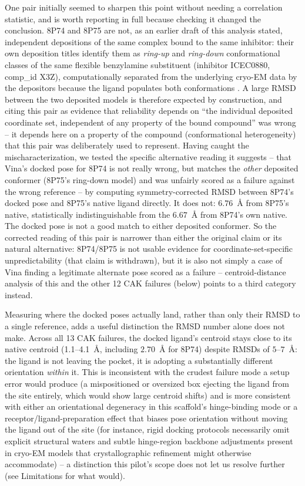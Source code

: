 \documentclass[11pt]{article}
\begin{document}
One pair initially seemed to sharpen this point without needing a
correlation statistic, and is worth reporting in full because checking it
changed the conclusion. 8P74 and 8P75 are not, as an earlier draft of this
analysis stated, independent depositions of the same complex bound to the
same inhibitor: their own deposition titles identify them as
\emph{ring-up} and \emph{ring-down} conformational classes of the same
flexible benzylamine substituent (inhibitor ICEC0880, comp\_id X3Z),
computationally separated from the underlying cryo-EM data by the
depositors because the ligand populates both conformations
\citep{cushing2024}. A large RMSD between the two deposited models is
therefore expected by construction, and citing this pair as evidence that
reliability depends on ``the individual deposited coordinate set,
independent of any property of the bound compound'' was wrong -- it
depends here on a property of the compound (conformational heterogeneity)
that this pair was deliberately used to represent. Having caught the
mischaracterization, we tested the specific alternative reading it
suggests -- that Vina's docked pose for 8P74 is not really wrong, but
matches the \emph{other} deposited conformer (8P75's ring-down model) and
was unfairly scored as a failure against the wrong reference -- by
computing symmetry-corrected RMSD between 8P74's docked pose and 8P75's
native ligand directly. It does not: $6.76$~{\AA} from 8P75's native,
statistically indistinguishable from the $6.67$~{\AA} from 8P74's own
native. The docked pose is not a good match to either deposited
conformer. So the corrected reading of this pair is narrower than either
the original claim or its natural alternative: 8P74/8P75 is not usable
evidence for coordinate-set-specific unpredictability (that claim is
withdrawn), but it is also not simply a case of Vina finding a legitimate
alternate pose scored as a failure -- centroid-distance analysis of this
and the other 12 CAK failures (below) points to a third category instead.

Measuring where the docked poses actually land, rather than only their
RMSD to a single reference, adds a useful distinction the RMSD number
alone does not make. Across all 13 CAK failures, the docked ligand's
centroid stays close to its native centroid (1.1--4.1~{\AA}, including
$2.70$~{\AA} for 8P74) despite RMSDs of $5$--$7$~{\AA}: the ligand is not
leaving the pocket, it is adopting a substantially different orientation
\emph{within} it. This is inconsistent with the crudest failure mode a
setup error would produce (a mispositioned or oversized box ejecting the
ligand from the site entirely, which would show large centroid shifts) and
is more consistent with either an orientational degeneracy in this
scaffold's hinge-binding mode or a receptor/ligand-preparation effect that
biases pose orientation without moving the ligand out of the site (for instance,
rigid docking protocols necessarily omit explicit structural waters and subtle
hinge-region backbone adjustments present in cryo-EM models that crystallographic
refinement might otherwise accommodate) -- a
distinction this pilot's scope does not let us resolve further (see
Limitations for what would).
\end{document}
